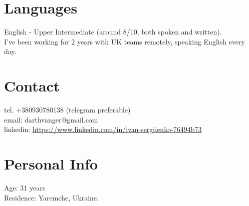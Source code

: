 \documentclass[a4paper, 14pt]{article}
\begin{document}
\section{Languages}
	English - Upper Intermediate (around 8/10, both spoken and written). \\
  I've been working for 2 years with UK teams remotely, speaking English every day.

\section{Contact}
	tel. +380930780138 (telegram preferable) \\
	email: darthvanger@gmail.com \\
  linkedin: \url{https://www.linkedin.com/in/ivan-sergiienko-76494b73} \\

\section{Personal Info}
	Age: 31 years \\
  Residence: Yaremche, Ukraine.
\end{document}

